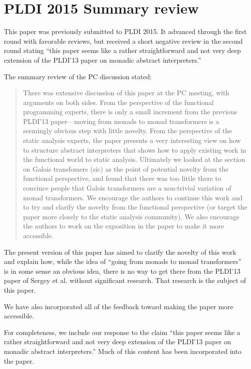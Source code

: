 \documentclass[nocopyrightspace,preprint,10pt]{sigplanconf}
\begin{document}
\balance



\appendix
\section{PLDI 2015 Summary review}

This paper was previously submitted to PLDI 2015. It advanced through
the first round with favorable reviews, but received a short negative
review in the second round stating ``this paper seems like a rather
straightforward and not very deep extension of the PLDI'13 paper on
monadic abstract interpreters.''

The summary review of the PC discussion stated:

\begin{quote}
There was extensive discussion of this paper at the PC meeting, with
arguments on both sides. From the perspective of the functional
programming experts, there is only a small increment from the previous
PLDI'13 paper---moving from monads to monad transformers is a
seemingly obvious step with little novelty. From the perspective of
the static analysis experts, the paper presents a very interesting
view on how to structure abstract interpreters that shows how to apply
existing work in the functional world to static analysis. Ultimately
we looked at the section on Galois transfomers (sic) as the point of
potential novelty from the functional perspective, and found that
there was too little there to convince people that Galois transformers
are a non-trivial variation of monad transformers. We encourage the
authors to continue this work and to try and clarify the novelty from
the functional perspective (or target the paper more closely to the
static analysis community). We also encourage the authors to work on
the exposition in the paper to make it more accessible.
\end{quote}

The present version of this paper has aimed to clarify the novelty of this work
and explain how, while the idea of ``going from monads to monad transformers''
is in some sense an obvious idea, there is no way to get there from the PLDI'13
paper of Sergey et al. without significant research. That research is the
subject of this paper.

We have also incorporated all of the feedback toward making the paper
more accessible.

For completeness, we include our response to the claim ``this paper
seems like a rather straightforward and not very deep extension of the
PLDI'13 paper on monadic abstract interpreters.''  Much of this
content has been incorporated into the paper.
\end{document}
